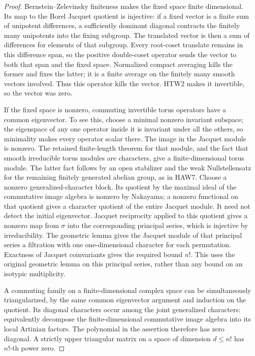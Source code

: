 \documentclass[11pt,a4paper]{article}
\numberwithin{equation}{section}
\theoremstyle{remark}\newtheorem{remark}[theorem]{Remark}
\begin{document}
\begin{proof}
Bernstein--Zelevinsky finiteness makes the fixed space finite
dimensional.  Its map to the Borel Jacquet quotient is
injective: if a fixed vector is a finite sum of unipotent
differences, a sufficiently dominant diagonal contracts
the finitely many unipotents into the fixing subgroup.
The translated vector is then a sum of differences
for elements of that subgroup.  Every root-coset
translate remains in this difference span, so the
positive double-coset operator sends the vector to
both that span and the fixed space.  Normalized
compact averaging kills the former and fixes the
latter; it is a finite average on the finitely
many smooth vectors involved.  Thus this operator
kills the vector.  HTW2 makes it invertible, so
the vector was zero.

If the fixed space is nonzero, commuting invertible torus
operators have a common eigenvector.  To see this, choose
a minimal nonzero invariant subspace; the eigenspace of
any one operator inside it is invariant under all the
others, so minimality makes every operator scalar there.
The image in the Jacquet module is nonzero.
The retained finite-length theorem for that module,
and the fact that smooth irreducible torus modules
are characters, give a finite-dimensional torus
module.  The latter fact follows by an open
stabilizer and the weak Nullstellensatz for the
remaining finitely generated abelian group, as
in HAW7.  Choose a nonzero generalized-character
block.  Its quotient by the maximal ideal of the
commutative image algebra is nonzero by Nakayama;
a nonzero functional on that quotient gives a
character quotient of the entire Jacquet module.
It need not detect the initial eigenvector.
Jacquet reciprocity applied to this quotient
gives a nonzero map from \(\sigma\) into the
corresponding principal series, which is injective
by irreducibility.  The geometric lemma gives the Jacquet
module of that principal series a filtration with one
one-dimensional character for each permutation.  Exactness
of Jacquet coinvariants gives the required bound \(n!\).
This uses the original geometric lemma on this principal
series, rather than any bound on an isotypic multiplicity.

A commuting family on a finite-dimensional complex space
can be simultaneously triangularized, by the same common
eigenvector argument and induction on the quotient.  Its
diagonal characters occur among the joint generalized
characters: equivalently decompose the finite-dimensional
commutative image algebra into its local Artinian factors.
The polynomial in the assertion therefore has zero
diagonal.  A strictly upper triangular matrix on a space
of dimension \(d\le n!\) has \(n!\)-th power zero.


\end{proof}
\end{document}
